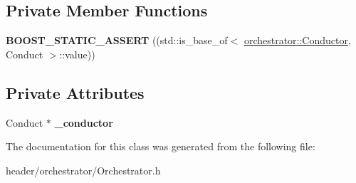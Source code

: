 \subsection*{Private Member Functions}
\begin{DoxyCompactItemize}
\item 
\mbox{\label{classorchestrator_1_1_orchestrator_a6359f5ee035da569d75a6186f744ffec}} 
{\bfseries B\+O\+O\+S\+T\+\_\+\+S\+T\+A\+T\+I\+C\+\_\+\+A\+S\+S\+E\+RT} ((std\+::is\+\_\+base\+\_\+of$<$ \hyperlink{classorchestrator_1_1_conductor}{orchestrator\+::\+Conductor}, Conduct $>$\+::value))
\end{DoxyCompactItemize}
\subsection*{Private Attributes}
\begin{DoxyCompactItemize}
\item 
\mbox{\label{classorchestrator_1_1_orchestrator_aa3351b2e1b8ab87669586f1caee3871a}} 
Conduct $\ast$ {\bfseries \+\_\+conductor}
\end{DoxyCompactItemize}


The documentation for this class was generated from the following file\+:\begin{DoxyCompactItemize}
\item 
header/orchestrator/Orchestrator.\+h\end{DoxyCompactItemize}
